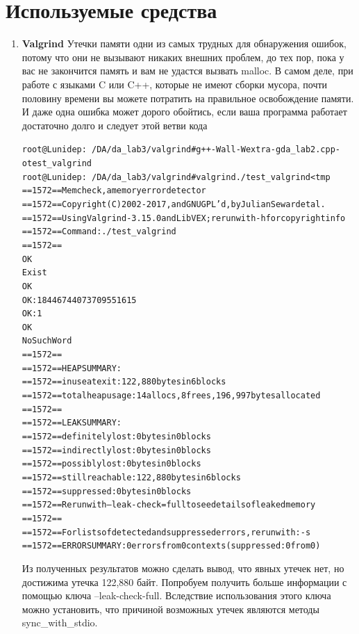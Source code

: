 \section{Используемые средства}
\begin{enumerate}
    \item \textbf{Valgrind} \newline
    Утечки памяти одни из самых трудных для обнаружения ошибок, потому что они не вызывают никаких внешних проблем, до тех пор, пока у вас не закончится память и вам не удастся вызвать malloc. В самом деле, при работе с языками C или C++, которые не имеют сборки мусора, почти половину времени вы можете потратить на правильное освобождение памяти. И даже одна ошибка может дорого обойтись, если ваша программа работает достаточно долго и следует этой ветви кода
    \begin{alltt}
    root@Lunidep:~/DA/da_lab3/valgrind# g++ -Wall -Wextra -g da_lab2.cpp -o test_valgrind
    root@Lunidep:~/DA/da_lab3/valgrind# valgrind ./test_valgrind < tmp
    ==1572== Memcheck, a memory error detector
    ==1572== Copyright (C) 2002-2017, and GNU GPL'd, by Julian Seward et al.
    ==1572== Using Valgrind-3.15.0 and LibVEX; rerun with -h for copyright info
    ==1572== Command: ./test_valgrind 
    ==1572== 
    OK
    Exist
    OK
    OK: 18446744073709551615
    OK: 1
    OK
    NoSuchWord
    ==1572== 
    ==1572== HEAP SUMMARY:
    ==1572==     in use at exit: 122,880 bytes in 6 blocks
    ==1572==   total heap usage: 14 allocs, 8 frees, 196,997 bytes allocated
    ==1572== 
    ==1572== LEAK SUMMARY:
    ==1572==    definitely lost: 0 bytes in 0 blocks
    ==1572==    indirectly lost: 0 bytes in 0 blocks
    ==1572==      possibly lost: 0 bytes in 0 blocks
    ==1572==    still reachable: 122,880 bytes in 6 blocks
    ==1572==         suppressed: 0 bytes in 0 blocks
    ==1572== Rerun with --leak-check=full to see details of leaked memory
    ==1572== 
    ==1572== For lists of detected and suppressed errors, rerun with: -s
    ==1572== ERROR SUMMARY: 0 errors from 0 contexts (suppressed: 0 from 0)
    \end{alltt}
    Из полученных результатов можно сделать вывод, что явных утечек нет, но достижима утечка 122,880 байт.\newline
    Попробуем получить больше информации с помощью ключа –leak-check-full. Вследствие использования этого ключа можно установить, что причиной возможных утечек являются методы sync_with_stdio.\newline



\end{enumerate}
